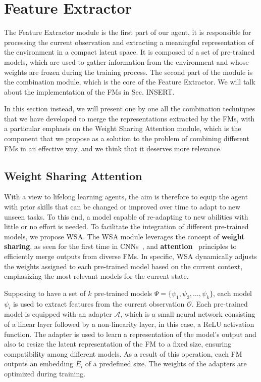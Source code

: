 \section{Feature Extractor} \label{sec:feature_extractor}
The Feature Extractor module is the first part of our agent, it is responsible for processing the current observation and extracting a meaningful representation of the environment in a compact latent space.
It is composed of a set of pre-trained models, which are used to gather information from the environment and whose weights are frozen during the training process.
The second part of the module is the combination module, which is the core of the Feature Extractor.
We will talk about the implementation of the FMs in Sec. INSERT.

In this section instead, we will present one by one all the combination techniques that we have developed to merge the representations extracted by the FMs, with a particular emphasis on the Weight Sharing Attention module, which is the component that we propose as a solution to the problem of combining different FMs in an effective way, and we think that it deserves more relevance.


\subsection{Weight Sharing Attention}
\label{sec:wsa}

With a view to lifelong learning agents, the aim is therefore to equip the agent with prior skills that can be changed or improved over time to adapt to new unseen tasks.
To this end, a model capable of re-adapting to new abilities with little or no effort is needed.
To facilitate the integration of different pre-trained models, we propose WSA\@.
The WSA module leverages the concept of \textbf{weight sharing}, as seen for the first time in CNNs~\citep{fukushima1980neocognitron}, and \textbf{attention}~\citep{vaswani2017attention} principles to efficiently merge outputs from diverse FMs.
In specific, WSA dynamically adjusts the weights assigned to each pre-trained model based on the current context, emphasizing the most relevant models for the current state.

Supposing to have a set of $k$ pre-trained models $\Psi = \{\psi_1, \psi_2, \ldots, \psi_k\}$, each model $\psi_i$ is used to extract features from the current observation $\mathcal{O}$.
Each pre-trained model is equipped with an adapter $\mathcal{A}$, which is a small neural network consisting of a linear layer followed by a non-linearity layer, in this case, a ReLU activation function.
The adapter is used to learn a representation of the model's output and also to resize the latent representation of the FM to a fixed size, ensuring compatibility among different models.
As a result of this operation, each FM outputs an embedding $E_i$ of a predefined size.
The weights of the adapters are optimized during training.


